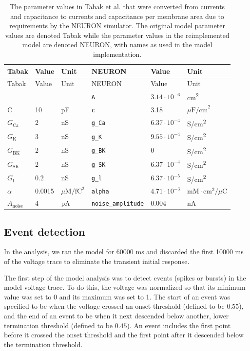 \documentclass[10pt,a4paper,onecolumn]{article}
\begin{document}
\hypertarget{tbl:parameters}{}
\begin{longtable}[]{@{}llllll@{}}
\caption{\label{tbl:parameters}The parameter values in Tabak et al.
\autocite{tabak2011} that were converted from currents and capacitance
to currents and capacitance per membrane area due to requirements by the
NEURON simulator. The original model parameter values are denoted Tabak
while the parameter values in the reimplemented model are denoted
NEURON, with names as used in the model implementation. }\tabularnewline
\toprule
Tabak & Value & Unit & NEURON & Value & Unit\tabularnewline
\midrule
\endfirsthead
\toprule
Tabak & Value & Unit & NEURON & Value & Unit\tabularnewline
\midrule
\endhead
& & & \texttt{A} & \(3.14 \cdot 10^{-6}\) &
cm\textsuperscript{2}\tabularnewline
C & 10 & pF & \texttt{c} & 3.18 & \(\mu \mathrm{F/cm}^2\)\tabularnewline
\(G_{\mathrm{Ca}}\) & 2 & nS & \texttt{g\_Ca} & \(6.37 \cdot 10^{-4}\) &
S/cm\textsuperscript{2}\tabularnewline
\(G_{\mathrm{K}}\) & 3 & nS & \texttt{g\_K} & \(9.55 \cdot 10^{-4}\) &
S/cm\textsuperscript{2}\tabularnewline
\(G_{\mathrm{BK}}\) & 2 & nS & \texttt{g\_BK} & \(0\) &
S/cm\textsuperscript{2}\tabularnewline
\(G_{\mathrm{SK}}\) & 2 & nS & \texttt{g\_SK} & \(6.37 \cdot 10^{-4}\) &
S/cm\textsuperscript{2}\tabularnewline
\(G_{\mathrm{l}}\) & 0.2 & nS & \texttt{g\_l} & \(6.37 \cdot 10^{-5}\) &
S/cm\textsuperscript{2}\tabularnewline
\(\alpha\) & 0.0015 & \(\mu \mathrm{M/fC}^2\) & \texttt{alpha} &
\(4.71 \cdot 10^{-3}\) &
\(\mathrm{mM} \cdot \mathrm{cm}^2 \mathrm{/} \mu \mathrm{C}\)\tabularnewline
\(A_{\mathrm{noise}}\) & 4 & pA & \texttt{noise\_amplitude} & \(0.004\)
& nA\tabularnewline
\bottomrule
\end{longtable}

\subsection{Event detection}\label{event-detection}

In the analysis, we ran the model for 60000 ms and discarded the first
10000 ms of the voltage trace to eliminate the transient initial
response.

The first step of the model analysis was to detect events (spikes or
bursts) in the model voltage trace. To do this, the voltage was
normalized so that its minimum value was set to 0 and its maximum was
set to 1. The start of an event was specified to be when the voltage
crossed an onset threshold (defined to be \(0.55\)), and the end of an
event to be when it next descended below another, lower termination
threshold (defined to be \(0.45\)). An event includes the first point
before it crossed the onset threshold and the first point after it
descended below the termination threshold.
\end{document}
